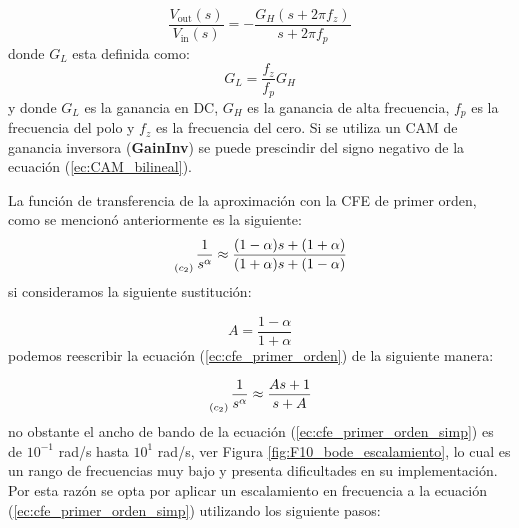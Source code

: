 	\begin{equation}
		\frac{V_{\mathrm{out}} (s)}{V_{\mathrm{in}}(s)} = -\frac{G_{H} (s + 2 \pi f_{z})}{s + 2 \pi f_{p}}
		\label{ec:CAM_bilineal}
	\end{equation}
	donde $G_{L}$ esta definida como:
	\begin{equation}
		G_{L} = \frac{f_{z}}{f_{p}} G_{H}
	\end{equation}
	y donde $G_{L}$ es la ganancia en DC, $G_{H}$ es la ganancia de alta frecuencia, $f_{p}$ es la frecuencia del polo y $f_{z}$ es la frecuencia del cero. Si se utiliza un CAM de ganancia inversora (\textbf{GainInv}) se puede prescindir del signo negativo de la ecuación (\ref{ec:CAM_bilineal}).
	
	La función de transferencia de la aproximación con la CFE de primer orden, como se mencionó anteriormente es la siguiente:
	\begin{equation}
		\genfrac{}{}{0pt}{0}{}{_{(c_{2})}} \frac{1}{s^{\alpha}} \approx \frac{(1 - \alpha)s + (1 + \alpha) }{(1 + \alpha)s + (1 - \alpha)} 
		\label{ec:cfe_primer_orden}
	\end{equation}
	si consideramos la siguiente sustitución:
	
	\begin{equation}
		A = \frac{1 - \alpha}{1 + \alpha}
	\end{equation}
	podemos reescribir la ecuación (\ref{ec:cfe_primer_orden}) de la siguiente manera:
	
	\begin{equation}
		\genfrac{}{}{0pt}{0}{}{_{(c_{2})}} \frac{1}{s^{\alpha}} \approx \frac{A s + 1}{s + A}
		\label{ec:cfe_primer_orden_simp}
	\end{equation}
	no obstante el ancho de bando de la ecuación (\ref{ec:cfe_primer_orden_simp}) es de $10^{-1}$ rad/s hasta $10^{1}$ rad/s, ver Figura \ref{fig:F10_bode_escalamiento}, lo cual es un rango de frecuencias muy bajo y presenta dificultades en su implementación. Por  esta razón se opta por aplicar un escalamiento en frecuencia a la ecuación (\ref{ec:cfe_primer_orden_simp}) utilizando los siguiente pasos: 
	
